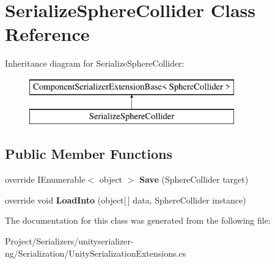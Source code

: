 \hypertarget{class_serialize_sphere_collider}{}\section{Serialize\+Sphere\+Collider Class Reference}
\label{class_serialize_sphere_collider}
Inheritance diagram for Serialize\+Sphere\+Collider\+:\begin{figure}[H]
\begin{center}
\leavevmode
\includegraphics[height=2.000000cm]{class_serialize_sphere_collider}
\end{center}
\end{figure}
\subsection*{Public Member Functions}
\begin{DoxyCompactItemize}
\item 
\mbox{\label{class_serialize_sphere_collider_ac3b7c3a6cbd6599135b7d6fbddacbf71}} 
override I\+Enumerable$<$ object $>$ {\bfseries Save} (Sphere\+Collider target)
\item 
\mbox{\label{class_serialize_sphere_collider_ad8c33e68733624815a5963c26c62d3e4}} 
override void {\bfseries Load\+Into} (object\mbox{[}$\,$\mbox{]} data, Sphere\+Collider instance)
\end{DoxyCompactItemize}


The documentation for this class was generated from the following file\+:\begin{DoxyCompactItemize}
\item 
Project/\+Serializers/unityserializer-\/ng/\+Serialization/Unity\+Serialization\+Extensions.\+cs\end{DoxyCompactItemize}
